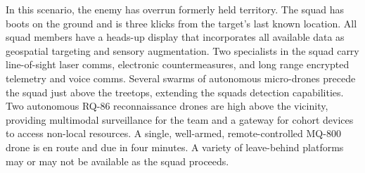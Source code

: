 In this scenario, the enemy has overrun formerly held territory.
The squad has boots on the ground and is three klicks from the target's last known location.
All squad members have a heads-up display that incorporates all available data as geospatial targeting and sensory augmentation.
Two specialists in the squad carry line-of-sight laser comms, electronic countermeasures, and long range encrypted telemetry and voice comms.
Several swarms of autonomous micro-drones precede the squad just above the treetops, extending the squads detection capabilities.
Two autonomous RQ-86 reconnaissance drones are high above the vicinity, providing multimodal surveillance for the team and a gateway for cohort devices to access non-local resources.
A single, well-armed, remote-controlled MQ-800 drone is en route and due in four minutes.
A variety of leave-behind platforms may or may not be available as the squad proceeds.